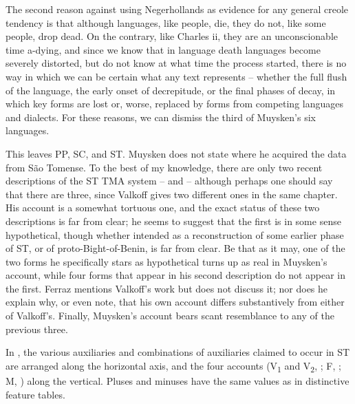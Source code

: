 
The second reason against using Negerhollands as evidence for any general creole tendency is that although languages, like people, die, they do not, like some people, drop dead. On the contrary, like Charles {\sc ii}, they are an unconscionable time a-dying, and since we know that in language death languages become severely distorted, but do not know at what time the process started, there is no way in which we can be certain what any text represents -- whether the full flush of the language, the early onset of decrepitude, or the final phases of decay, in which key forms are lost or, worse, replaced by forms from competing languages and dialects. For these reasons, we can dismiss the third of Muysken's six languages.

This leaves PP, SC, and ST. Muysken does not state where he acquired the data from S{\~a}o Tomense. To the best of my knowledge, there are only two recent descriptions of the ST TMA system -- \citealt{Valkoff1966} and \citealt{Ferraz1979} -- although perhaps one should say that there are three, since Valkoff gives two different ones in the same chapter. His account is a somewhat tortuous one, and the exact status of these two descriptions is far from clear; he seems to suggest that the first is in some sense hypothetical, though whether intended as a reconstruc\-tion of some earlier phase of ST, or of proto-Bight-of-Benin, is far from clear. Be that as it may, one of the two forms he specifically stars as hypothetical turns up as real in Muysken's account, while four forms that appear in his second description do not appear in the first. Ferraz mentions Valkoff's work but does not discuss it; nor does he explain why, or even note, that his own account differs substantively from either of Valkoff's. Finally, Muysken's account bears scant resemblance to any of the previous three.

In %
, the various auxiliaries and combinations of auxiliaries claimed to occur in ST are arranged along the horizontal axis, and the four accounts (V\textsubscript{1} and V\textsubscript{2}, \citealt{Valkoff1966}; F, \citealt{Ferraz1979}; M, \citealt{Muysken1981a}) along the vertical. Pluses and minuses have the same values as in distinctive feature tables.

